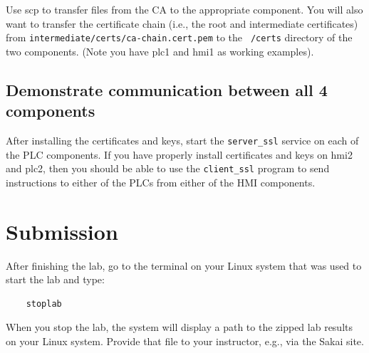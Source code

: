 Use scp to transfer files from the CA to the appropriate component.
You will also want to transfer the certificate chain (i.e., the root and intermediate
certificates) from {\tt intermediate/certs/ca-chain.cert.pem} to the {\tt ~/certs} directory 
of the two components.  (Note you have plc1 and hmi1 as working examples).

\subsection{Demonstrate communication between all 4 components}
After installing the certificates and keys, start the {\tt server\_ssl}
service on each of the PLC components.
If you have properly install certificates and keys on hmi2 and plc2, then you should
be able to use the {\tt client\_ssl} program to send instructions to either of the
PLCs from either of the HMI components.  

\section{Submission}
After finishing the lab, go to the terminal on your Linux system that was used to start the lab and type:
\begin{verbatim}
    stoplab 
\end{verbatim}
When you stop the lab, the system will display a path to the zipped lab results on your Linux system.  Provide that file to 
your instructor, e.g., via the Sakai site.



